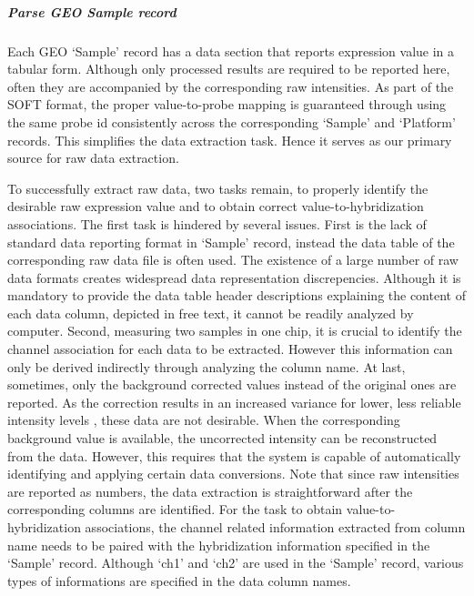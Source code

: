 \subparagraph{\textit{Parse GEO Sample record}}
Each GEO `Sample' record has a data section that reports expression value in a
tabular form.
%
Although only processed results are required to be reported here, often they
are accompanied by the corresponding raw intensities.
%
As part of the SOFT format, the proper value-to-probe mapping is guaranteed
through using the same probe id consistently across the corresponding `Sample'
and `Platform' records.
%
This simplifies the data extraction task. 
%
Hence it serves as our primary source for raw data extraction.

To successfully extract raw data, two tasks remain, to properly identify the
desirable raw expression value and to obtain correct value-to-hybridization
associations.
%
The first task is hindered by several issues. 
%
First is the lack of standard data reporting format in `Sample' record,
instead the data table of the corresponding raw data file is often used.
%
The existence of a large number of raw data formats creates widespread data
representation discrepencies.
%
Although it is mandatory to provide the data table header descriptions
explaining the content of each data column, depicted in free text, it cannot
be readily analyzed by computer.
%
Second, measuring two samples in one chip, it is crucial to identify the
channel association for each data to be extracted.  However this information
can only be derived indirectly through analyzing the column name.
%
At last, sometimes, only the background corrected values instead of the
original ones are reported.  As the correction results in an increased
variance for lower, less reliable intensity levels \cite{Ritchie2007}, these
data are not desirable.
%
When the corresponding background value is available, the uncorrected
intensity can be reconstructed from the data.  However, this requires that the
system is capable of automatically identifying and applying certain data
conversions.
%
Note that since raw intensities are reported as numbers, the data extraction
is straightforward after the corresponding columns are identified.
%
For the task to obtain value-to-hybridization associations, the channel
related information extracted from column name needs to be paired with the
hybridization information specified in the `Sample' record.
%
Although `ch1' and `ch2' are used in the `Sample' record, various types of
informations are specified in the data column names.


